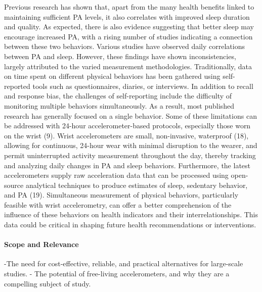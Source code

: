 \documentclass[
  10pt,
  letterpaper,
  DIV=11,
  numbers=noendperiod]{scrartcl}
\let\oldparagraph\paragraph
\renewcommand{\paragraph}[1]{\oldparagraph{#1}\mbox{}}
\begin{document}
Previous research has shown that, apart from the many health benefits
linked to maintaining sufficient PA levels, it also correlates with
improved sleep duration and quality\autocite{kredlow_effects_2015}. As
expected, there is also evidence suggesting that better sleep may
encourage increased
PA\autocite{lambiase_temporal_2013,mcglinchey_physical_2014}, with a
rising number of studies indicating a connection between these two
behaviors\autocite{dolezal_interrelationship_2017,chennaoui_sleep_2015}.
Various studies have observed daily correlations between PA and
sleep\autocite{pettee_gabriel_bidirectional_2017,kishida_intensive_2016}.
However, these findings have shown inconsistencies, largely attributed
to the varied measurement methodologies. Traditionally, data on time
spent on different physical behaviors has been gathered using
self-reported tools such as questionnaires, diaries, or
interviews\autocite{dowd_systematic_2018}. In addition to recall and
response bias, the challenges of self-reporting include the difficulty
of monitoring multiple behaviors
simultaneously\autocite{rosenberger_24-hour_2019}. As a result, most
published research has generally focused on a single behavior. Some of
these limitations can be addressed with 24-hour accelerometer-based
protocols, especially those worn on the wrist (9). Wrist accelerometers
are small, non-invasive, waterproof (18), allowing for continuous,
24-hour wear with minimal disruption to the wearer, and permit
uninterrupted activity measurement throughout the day, thereby tracking
and analyzing daily changes in PA and sleep behaviors. Furthermore, the
latest accelerometers supply raw acceleration data that can be processed
using open-source analytical techniques to produce estimates of sleep,
sedentary behavior, and PA (19). Simultaneous measurement of physical
behaviors, particularly feasible with wrist accelerometry, can offer a
better comprehension of the influence of these behaviors on health
indicators and their interrelationships. This data could be critical in
shaping future health recommendations or interventions.

\hypertarget{scope-and-relevance}{%
\paragraph{Scope and Relevance}\label{scope-and-relevance}}

-The need for cost-effective, reliable, and practical alternatives for
large-scale studies. - The potential of free-living accelerometers, and
why they are a compelling subject of study.
\end{document}

